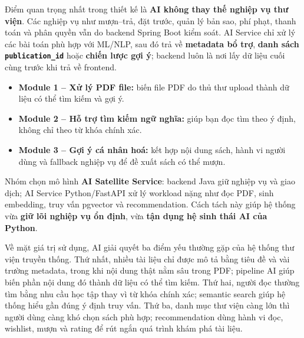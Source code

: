 Điểm quan trọng nhất trong thiết kế là \textbf{AI không thay thế nghiệp vụ thư viện}. Các nghiệp vụ như mượn--trả, đặt trước, quản lý bản sao, phí phạt, thanh toán và phân quyền vẫn do backend Spring Boot kiểm soát. AI Service chỉ xử lý các bài toán phù hợp với ML/NLP, sau đó trả về \textbf{metadata bổ trợ}, \textbf{danh sách \texttt{publication\_id}} hoặc \textbf{chiến lược gợi ý}; backend luôn là nơi lấy dữ liệu cuối cùng trước khi trả về frontend.

\begin{itemize}
    \item \textbf{Module 1 -- Xử lý PDF file:} biến file PDF do thủ thư upload thành dữ liệu có thể tìm kiếm và gợi ý.
    \item \textbf{Module 2 -- Hỗ trợ tìm kiếm ngữ nghĩa:} giúp bạn đọc tìm theo ý định, không chỉ theo từ khóa chính xác.
    \item \textbf{Module 3 -- Gợi ý cá nhân hoá:} kết hợp nội dung sách, hành vi người dùng và fallback nghiệp vụ để đề xuất sách có thể mượn.
\end{itemize}

Nhóm chọn mô hình \textbf{AI Satellite Service}: backend Java giữ nghiệp vụ và giao dịch; AI Service Python/FastAPI xử lý workload nặng như đọc PDF, sinh embedding, truy vấn pgvector và recommendation. Cách tách này giúp hệ thống vừa \textbf{giữ lõi nghiệp vụ ổn định}, vừa \textbf{tận dụng hệ sinh thái AI của Python}.

Về mặt giá trị sử dụng, AI giải quyết ba điểm yếu thường gặp của hệ thống thư
viện truyền thống. Thứ nhất, nhiều tài liệu chỉ được mô tả bằng tiêu đề và vài
trường metadata, trong khi nội dung thật nằm sâu trong PDF; pipeline AI giúp
biến phần nội dung đó thành dữ liệu có thể tìm kiếm. Thứ hai, người đọc thường
tìm bằng nhu cầu học tập thay vì từ khóa chính xác; semantic search giúp hệ
thống hiểu gần đúng ý định truy vấn. Thứ ba, danh mục thư viện càng lớn thì
người dùng càng khó chọn sách phù hợp; recommendation dùng hành vi đọc, wishlist,
mượn và rating để rút ngắn quá trình khám phá tài liệu.

